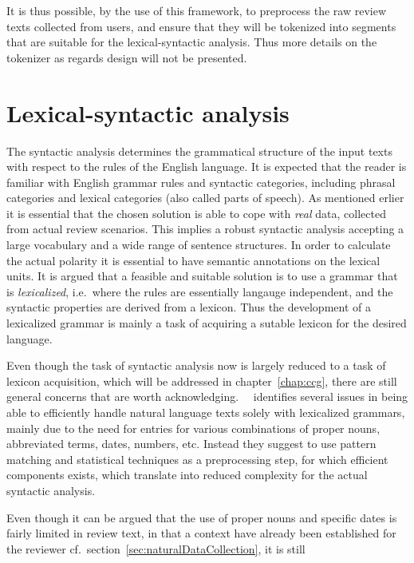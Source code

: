 It is thus possible, by the use of this framework, to preprocess the raw review texts collected from users, and ensure that they will be tokenized into segments that are suitable for the lexical-syntactic analysis. Thus more details on the tokenizer as regards design will not be presented.

\section{Lexical-syntactic analysis}
\label{sec:syntacticAnalysis}
The syntactic analysis determines the grammatical structure of the input texts with respect to the rules of the English language. It is expected that the reader is familiar with English grammar rules and syntactic categories, including phrasal categories and lexical categories (also called parts of speech). As mentioned erlier it is essential that the chosen solution is able to cope with \emph{real} data, collected from actual review scenarios. This implies a robust syntactic analysis accepting a large vocabulary and a wide range of sentence structures. In order to calculate the actual polarity it is essential to have semantic annotations on the lexical units. It is argued that a feasible and suitable solution is to use a grammar that is \emph{lexicalized}, i.e.\ where the rules are essentially langauge independent, and the syntactic properties are derived from a lexicon. Thus the development of a lexicalized grammar is mainly a task of acquiring a sutable lexicon for the desired language.

Even though the task of syntactic analysis now is largely reduced to a task of lexicon acquisition, which will be addressed in chapter~\ref{chap:ccg}, there are still general concerns that are worth acknowledging. \citeauthor{extendingCCG}~\ identifies several issues in being able to efficiently handle natural language texts solely with lexicalized grammars, mainly due to the need for entries for various combinations of proper nouns, abbreviated terms, dates, numbers, etc. Instead they suggest to use pattern matching and statistical techniques as a preprocessing step, for which efficient components exists, which translate into reduced complexity for the actual syntactic analysis.

Even though it can be argued that the use of proper nouns and specific dates is fairly limited in review text, in that a context have already been established for the reviewer cf.\ section~\ref{sec:naturalDataCollection}, it is still 


